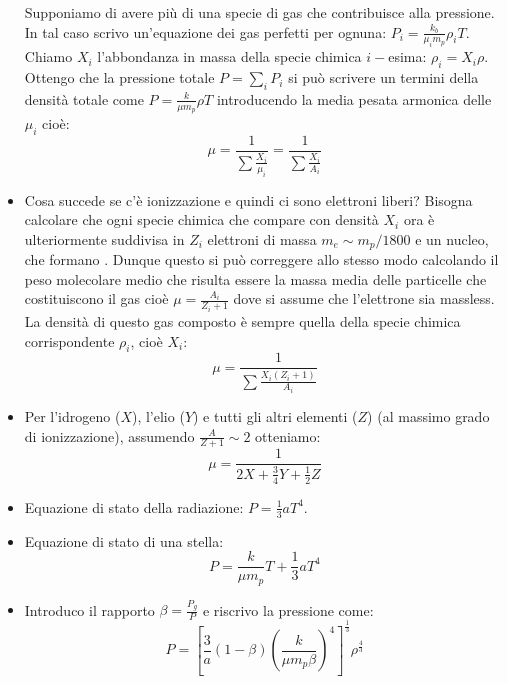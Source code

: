 \documentclass[11pt,a4paper]{article}
\begin{document}
\begin{itemize}
Supponiamo di avere più di una specie di gas che contribuisce alla pressione. In tal caso scrivo un'equazione dei gas perfetti per ognuna: $P_i = \frac{k_b}{\mu_i m_p} \rho_i T$. Chiamo $X_i$ l'abbondanza in massa della specie chimica $i-$esima: $\rho_i = X_i \rho$. Ottengo che la pressione totale $P = \sum_i P_i$ si può scrivere un termini della densità totale come $P = \frac{k}{\mu m_p} \rho T$ introducendo la media pesata armonica delle $\mu_i$ cioè:
\begin{equation}
\mu = \frac{1}{\sum \frac{X_i}{\mu_i}} = \frac{1}{\sum \frac{X_i}{A_i}}
\end{equation}

\item Cosa succede se c'è ionizzazione e quindi ci sono elettroni liberi? Bisogna calcolare che ogni specie chimica che compare con densità $X_i$ ora è ulteriormente suddivisa in $Z_i$ elettroni di massa $m_e \sim m_p/1800$ e un nucleo, che formano . Dunque questo si può correggere allo stesso modo calcolando il peso molecolare medio che risulta essere la massa media delle particelle che costituiscono il gas cioè $\mu = \frac{A_i}{Z_i + 1}$ dove si assume che l'elettrone sia massless. La densità di questo gas composto è sempre quella della specie chimica corrispondente $\rho_i$, cioè $X_i$:
\begin{equation}
\mu = \frac{1}{\sum \frac{X_i (Z_i +1)}{A_i}}
\end{equation}

\item Per l'idrogeno ($X$), l'elio ($Y$) e tutti gli altri elementi ($Z$) (al massimo grado di ionizzazione), assumendo $\frac{A}{Z+1} \sim 2$ otteniamo:
\begin{equation}
\mu = \frac{1}{2 X + \frac{3}{4} Y + \frac{1}{2} Z}
\end{equation}

\item Equazione di stato della radiazione: $P = \frac{1}{3} a T^4$.

\item Equazione di stato di una stella:
\begin{equation}
P = \frac{k}{\mu m_p} T + \frac{1}{3} a T^4
\end{equation}

\item Introduco il rapporto $\beta = \frac{P_g}{P}$ e riscrivo la pressione come:
\begin{equation}
P = \left[ \frac{3}{a} (1 - \beta ) \left( \frac{k}{\mu m_p \beta} \right) ^ 4 \right]^{\frac{1}{3}} \rho^{\frac{4}{3}}
\end{equation}


\end{itemize}
\end{document}

